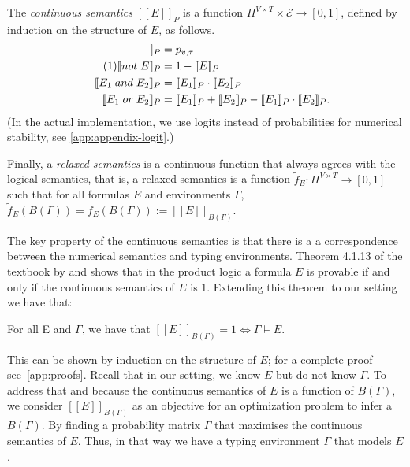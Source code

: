 \documentclass[acmsmall, review, anonymous]{acmart}\settopmatter{printfolios=true,printccs=false,printacmref=false}
\newcommand{\qqpi}[2]{[\![#2]\!]_{#1}}
\newcommand\numberthis{\addtocounter{equation}{1}\tag{\theequation}}
\newcommand{\margincomment}[2]{\marginpar{\scriptsize\color{Maroon}#1 says: #2}}
\newcommand{\ivp}[1]{\margincomment{IVP}{#1}}
\begin{document}
The \emph{continuous semantics} $\qqpi{P}{E}$ is a function $\Pi^{V \times T} \times \mathcal{E} \rightarrow [0, 1]$,
defined by induction on the structure of $E$, as follows.
\begin{align*}
	\qqpi{P}{x_v \mathrel{is} l_\tau} & = p_{v,\tau}                        \\  \numberthis \label{eq:logical}
	\qqpi{P}{\mathrel{not} E}         & = 1-\qqpi{P}{E}                     \\
	\qqpi{P}{E_1 \mathrel{and} E_2}   & = \qqpi{P}{E_1} \cdot \qqpi{P}{E_2} \\
	\qqpi{P}{E_1 \mathrel{or} E_2}    & =
	\qqpi{P}{E_1} + \qqpi{P}{E_2} - \qqpi{P}{E_1}\cdot\qqpi{P}{E_2}.
\end{align*}
(In the actual implementation, we use logits instead of probabilities
for numerical stability, see \cref{app:appendix-logit}.)

Finally, a \emph{relaxed semantics} is a continuous function
that always agrees with the logical semantics, that is,
a relaxed semantics is a function
$\tilde{f}_{E} : \Pi^{V \times T}  \rightarrow [0, 1]$
such that for all formulas $E$ and environments $\Gamma$,
$\tilde{f}_{E}(B(\Gamma)) = f_E(B(\Gamma)) := \qqpi{B(\Gamma)}{E}$.

The key property of the continuous semantics is that there is a 
a correspondence between the numerical semantics and typing environments.
Theorem 4.1.13 of the textbook by \citet{hajek98} and shows that in the product logic a formula $E$ is provable if and only if the continuous semantics of $E$ is $1$.
Extending this theorem to our setting we have that: 
\begin{theorem}\label{eq:soft2hard}
For all E and $\Gamma$, we have that $\qqpi{B(\Gamma)}{E} = 1 \Leftrightarrow \Gamma \models E.$     
\end{theorem}
This can be shown by induction on the structure of $E$;
for a complete proof see~\cref{app:proofs}.
Recall that in our setting, we know $E$ but
do not know $\Gamma$. To address that 
and because the continuous semantics of $E$ is a function of $B(\Gamma)$, we consider $\qqpi{B(\Gamma)}{E}$ as an objective for an optimization problem to infer a $B(\Gamma)$. By finding a probability matrix $\Gamma$ that maximises the continuous semantics of $E$. Thus, in that way we have a typing environment $\Gamma$ that models $E$. 
\end{document}
